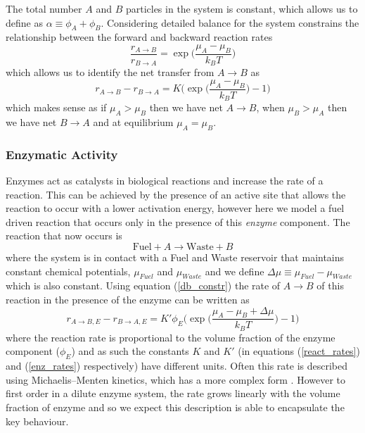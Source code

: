 The total number $A$ and $B$ particles in the system is constant, which allows us to define as $\alpha \equiv \phi_A+\phi_B$. Considering detailed balance for the system constrains the relationship between the forward and backward reaction rates
\begin{equation}
    \frac{r_{A \rightarrow B}}{r_{B \rightarrow A}} = \exp\Bigg(\frac{\mu_A - \mu_B}{k_B T}\Bigg)
    \label{db_constr}
\end{equation}
which allows us to identify the net transfer from $A \rightarrow B$ as
\begin{equation}
    r_{A \rightarrow B} - r_{B \rightarrow A} = K\Bigg(\exp\bigg(\frac{\mu_A - \mu_B}{k_B T}\bigg)-1\Bigg)
    \label{react_rates}
\end{equation}
which makes sense as if $\mu_A > \mu_B$ then we have net $A \rightarrow B$, when $\mu_B > \mu_A$ then we have net $B \rightarrow A$ and at equilibrium $\mu_A = \mu_B$\cite{weber2019physics}.

\subsubsection{Enzymatic Activity}
Enzymes act as catalysts in biological reactions and increase the rate of a reaction. This can be achieved by the presence of an active site that allows the reaction to occur with a lower activation energy, however here we model a fuel driven reaction that occurs only in the presence of this \textit{enzyme} component. The reaction that now occurs is
\begin{equation}
    \text{Fuel} + A \rightarrow \text{Waste} + B
\end{equation}
where the system is in contact with a Fuel and Waste reservoir that maintains constant chemical potentials, $\mu_{Fuel}$ and $\mu_{Waste}$ and we define $\Delta\mu \equiv \mu_{Fuel}-\mu_{Waste}$ which is also constant. Using equation (\ref{db_constr}) the rate of $A \rightarrow B$ of this reaction in the presence of the enzyme can be written as
\begin{equation}
    r_{A \rightarrow B,E} - r_{B \rightarrow A,E} = K'\phi_E\Bigg(\exp\bigg(\frac{\mu_A - \mu_B + \Delta\mu}{k_B T}\bigg)-1\Bigg)
    \label{enz_rates}
\end{equation}
where the reaction rate is proportional to the volume fraction of the enzyme component ($\phi_E$) and as such the constants $K$ and $K'$ (in equations (\ref{react_rates}) and (\ref{enz_rates}) respectively) have different units. Often this rate is described using Michaelis–Menten kinetics, which has a more complex form \cite{murray_mathematical_1993}. However to first order in a dilute enzyme system, the rate grows linearly with the volume fraction of enzyme and so we expect this description is able to encapsulate the key behaviour.

